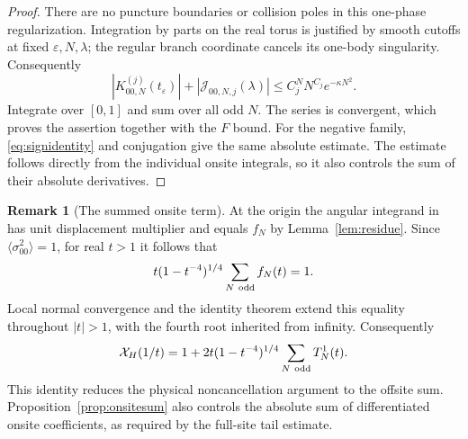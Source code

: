 \documentclass[11pt]{article}
\numberwithin{equation}{section}
\theoremstyle{definition}
\newtheorem{remark}[theorem]{Remark}
\newcommand{\eps}{\varepsilon}
\begin{document}
\begin{proof}
There are no puncture boundaries or collision poles in this
one-phase regularization. Integration by parts on the real torus
is justified by smooth cutoffs at fixed $\eps,N,\lambda$; the
regular branch coordinate cancels its one-body singularity.
Consequently
\[
 |K_{00,N}^{(j)}(t_\eps)|+
 |\mathcal J_{00,N,j}(\lambda)|
 \le C_j^N N^{C_j}e^{-\kappa N^2}.
\]
Integrate over $[0,1]$ and sum over all odd $N$. The series is
convergent, which proves the assertion together with the $F$ bound.
For the negative family, \eqref{eq:signidentity} and conjugation
give the same absolute estimate. The estimate follows directly from the individual onsite integrals,
so it also controls the sum of their absolute derivatives.
\end{proof}

\begin{remark}[The summed onsite term]
At the origin the angular integrand in
\cite[eqs.~(4.1)--(4.2)]{Orrick2001} has unit displacement multiplier
and equals $f_N$ by Lemma~\ref{lem:residue}.
Since $\langle\sigma_{00}^2\rangle=1$, for real $t>1$ it follows that
\[
 t(1-t^{-4})^{1/4}\sum_{N\ {\rm odd}}f_N(t)=1.
\]
Local normal convergence and the identity theorem extend this equality
throughout $|t|>1$, with the fourth root inherited from infinity.
Consequently
\[
 \mathcal X_H(1/t)=1+2t(1-t^{-4})^{1/4}
                    \sum_{N\ {\rm odd}}T_N^1(t).
\]
This identity reduces the physical noncancellation argument to the
offsite sum. Proposition~\ref{prop:onsitesum} also controls the absolute
sum of differentiated onsite coefficients, as required by the full-site
tail estimate.
\end{remark}
\end{document}
